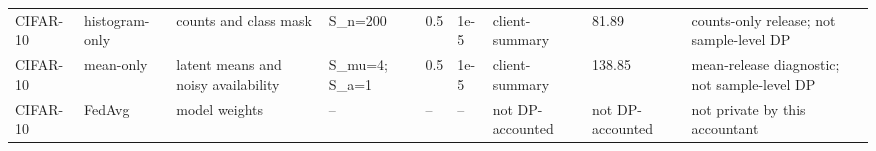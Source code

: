 \begin{table}[t]
{\begin{tabular}{lllllllll}
CIFAR-10 & histogram-only & counts and class mask & S\_n=200 & 0.5 & 1e-5 & client-summary & 81.89 & counts-only release; not sample-level DP \\
CIFAR-10 & mean-only & latent means and noisy availability & S\_mu=4; S\_a=1 & 0.5 & 1e-5 & client-summary & 138.85 & mean-release diagnostic; not sample-level DP \\
CIFAR-10 & FedAvg & model weights & -- & -- & -- & not DP-accounted & not DP-accounted & not private by this accountant \\
\bottomrule
\end{tabular}
}
\end{table}
